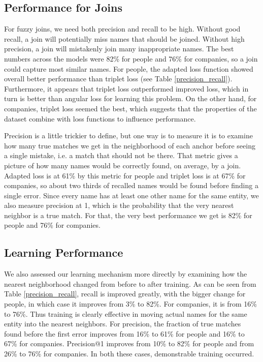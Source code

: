 \subsection{Performance for Joins}
For fuzzy joins, we need both precision and recall to be high.  Without good recall, a join will potentially miss names that should be joined.  Without high precision, a join will mistakenly join many inappropriate names.  The best numbers across the models were 82\% for people and 76\% for companies, so a join could capture most similar names.  For people, the adapted loss function showed overall better performance than triplet loss (see Table \ref{precision_recall}).  Furthermore, it appears that triplet loss outperformed improved loss, which in turn is better than angular loss for learning this problem.  On the other hand, for companies, triplet loss seemed the best, which suggests that the properties of the dataset combine with loss functions to influence performance.

 Precision is a little trickier to define, but one way is to measure it is to examine how many true matches we get in the neighborhood of each anchor before seeing a single mistake, i.e. a match that should not be there.  That metric gives a picture of how many names would be correctly found, on average, by a join.  Adapted loss is at 61\% by this metric for people and triplet loss is at 67\% for companies, so about two thirds of recalled names would be found before finding a single error.  Since every name has at least one other name for the same entity, we also measure precision at 1, which is the probability that the very nearest neighbor is a true match.  For that, the very best performance we get is 82\% for people and 76\% for companies.  


\subsection{Learning Performance}

 We also assessed our learning mechanism more directly by examining how the nearest neighborhood changed from before to after training.  As can be seen from Table \ref{precision_recall}, recall is improved greatly, with the bigger change for people, in which case it improves from 3\% to 82\%.  For companies, it is from 16\% to 76\%.  Thus training is clearly effective in moving actual names for the same entity into the nearest neighbors.  For precision, the fraction of true matches found before the first error improves from 16\% to 61\% for people and 16\% to 67\% for companies.  Precision@1 improves from 10\% to 82\% for people and from 26\% to 76\% for companies.  In both these cases, demonstrable training occurred.

